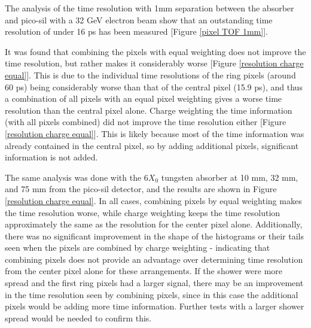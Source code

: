 \documentclass[twocolumn,aps,prd,reprint]{revtex4-1}
\begin{document}
The analysis of the time resolution with 1mm separation between the absorber and pico-sil with a 32 GeV electron beam show that an outstanding time resolution of under 16 ps has been measured [Figure \ref{pixel TOF 1mm}].

It was found that combining the pixels with equal weighting does not improve the time resolution, but rather makes it considerably worse [Figure \ref{resolution charge equal}]. This is due to the individual time resolutions of the ring pixels (around 60 ps) being considerably worse than that of the central pixel (15.9 ps), and thus a combination of all pixels with an equal pixel weighting gives a worse time resolution than the central pixel alone. Charge weighting the time information (with all pixels combined) did not improve the time resolution either [Figure \ref{resolution charge equal}]. This is likely because most of the time information was already contained in the central pixel, so by adding additional pixels, significant information is not added.

The same analysis was done with the 6$X_0$ tungsten absorber at 10 mm, 32 mm, and 75 mm from the pico-sil detector, and the results are shown in Figure \ref{resolution charge equal}. In all cases, combining pixels by equal weighting makes the time resolution worse, while charge weighting keeps the time resolution approximately the same as the resolution for the center pixel alone. Additionally, there was no significant improvement in the shape of the histograms or their tails seen when the pixels are combined by charge weighting - indicating that combining pixels does not provide an advantage over determining time resolution from the center pixel alone for these arrangements. If the shower were more spread and the first ring pixels had a larger signal, there may be an improvement in the time resolution seen by combining pixels, since in this case the additional pixels would be adding more time information. Further tests with a larger shower spread would be needed to confirm this.
\end{document}
